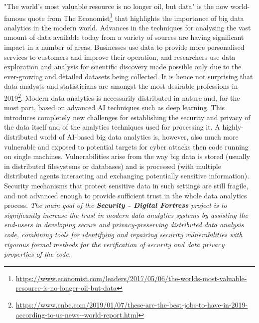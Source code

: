 \documentclass[a4paper,11pt]{article}
\newcommand{\project}[1]{\textbf{#1}\xspace}
\newcommand{\SECURITY}{\project{Security - Digital Fortress}}
\newcommand{\TheProject}{\SECURITY}
\begin{document}
"The world's most valuable resource is no longer oil, but data" is the now world-famous quote from The Economist\footnote{\url{https://www.economist.com/leaders/2017/05/06/the-worlds-most-valuable-resource-is-no-longer-oil-but-data}} that highlights the importance of big data analytics in the modern world. Advances in the techniques for analysing the vast amount of data available today from a variety of sources are having %
significant impact in a number of areas. Businesses use data to provide more personalised services to customers and improve their operation, and researchers use 
data exploration and analysis for scientific discovery made possible only due to %
the ever-growing and detailed datasets being collected. 
It is hence not surprising 
that data analysts and statisticians are amongst the most desirable professions in 2019\footnote{\url{https://www.cnbc.com/2019/01/07/these-are-the-best-jobs-to-have-in-2019-according-to-us-news--world-report.html}}. Modern data analytics is necessarily distributed in nature and, for the most part, based on advanced AI techniques such as deep learning.  This 
introduces
completely new challenges for establishing the security and privacy %
of the data itself and of the analytics techniques used for processing it. A highly-distributed world of AI-based big data analytics 
is, however, also much more vulnerable and exposed to
potential targets for cyber attacks then code running on single machines. Vulnerabilities arise %
from the way big data is stored (usually in distributed filesystems or databases) and is processed (with multiple distributed agents interacting and exchanging potentially sensitive information). Security mechanisms that protect sensitive data in such settings are still fragile, and not advanced enough to provide sufficient trust in the whole data analytics process. 
\emph{The main goal of the \TheProject{} project is to significantly increase the trust in modern data analytics systems by assisting the end-users in developing secure and privacy-preserving distributed data analysis code, combining tools for identifying and repairing security vulnerabilities with rigorous formal methods for the verification of security and data privacy properties of the code.}
\end{document}
